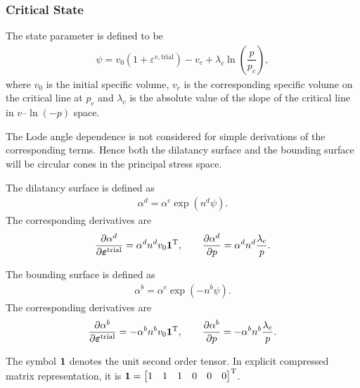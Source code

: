 \subsubsection{Critical State}
The state parameter is defined to be
\begin{gather*}
\psi=v_0\left(1+\varepsilon^{v,\text{trial}}\right)-v_c+\lambda_c\ln\left(\dfrac{p}{p_c}\right),
\end{gather*}
where $v_0$ is the initial specific volume, $v_c$ is the corresponding specific volume on the critical line at $p_c$ and $\lambda_c$ is the absolute value of the slope of the critical line in $v$--$\ln(-p)$ space.

The Lode angle dependence is not considered for simple derivations of the corresponding terms.
Hence both the dilatancy surface and the bounding surface will be circular cones in the principal stress space.

The dilatancy surface is defined as
\begin{gather*}
\alpha^d=\alpha^c\exp\left(n^d\psi\right).
\end{gather*}
The corresponding derivatives are
\begin{gather*}
\dfrac{\partial{\alpha^d}}{\partial{\bm{\varepsilon}^\text{trial}}}=\alpha^dn^dv_0\bm{1}^{\mathrm{T}},\qquad
\dfrac{\partial{\alpha^d}}{\partial{p}}=\alpha^dn^d\dfrac{\lambda_c}{p}.
\end{gather*}

The bounding surface is defined as
\begin{gather*}
\alpha^b=\alpha^c\exp\left(-n^b\psi\right).
\end{gather*}
The corresponding derivatives are
\begin{gather*}
\dfrac{\partial{\alpha^b}}{\partial{\bm{\varepsilon}^\text{trial}}}=-\alpha^bn^bv_0\bm{1}^{\mathrm{T}},\qquad
\dfrac{\partial{\alpha^b}}{\partial{p}}=-\alpha^bn^b\dfrac{\lambda_c}{p}.
\end{gather*}

The symbol $\bm{1}$ denotes the unit second order tensor. In explicit compressed matrix representation, it is $\bm{1}=\begin{bmatrix}
1&1&1&0&0&0
\end{bmatrix}^{\mathrm{T}}$.
